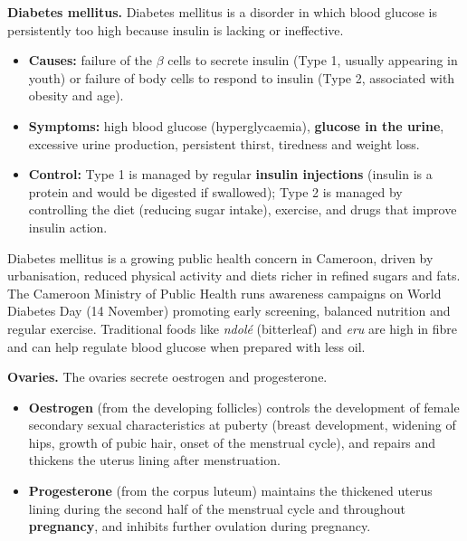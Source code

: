 \documentclass[11pt]{article}
\newcommand{\cle}[1]{{\popxbold\color{popdark}#1}}
\newcounter{popsec}
\newcounter{popsub}
\newcommand{\courssub}[1]{%
  \stepcounter{popsub}%
  \par\vspace{9pt}\noindent{\popxbold\fontsize{11.5}{13}\selectfont\color{popink}{\color{poporange}\thepopsec.\thepopsub}\hspace{6pt}#1}\par\nopagebreak\vspace{4pt}
}
\begin{document}
\textbf{Diabetes mellitus.} \cle{Diabetes mellitus} is a disorder in which blood glucose is persistently too high because insulin is lacking or ineffective.

\begin{itemize}
\item \textbf{Causes:} failure of the $\beta$ cells to secrete insulin (Type 1, usually appearing in youth) or failure of body cells to respond to insulin (Type 2, associated with obesity and age).
\item \textbf{Symptoms:} high blood glucose (hyperglycaemia), \textbf{glucose in the urine}, excessive urine production, persistent thirst, tiredness and weight loss.
\item \textbf{Control:} Type 1 is managed by regular \textbf{insulin injections} (insulin is a protein and would be digested if swallowed); Type 2 is managed by controlling the diet (reducing sugar intake), exercise, and drugs that improve insulin action.
\end{itemize}

\begin{savaistu}
Diabetes mellitus is a growing public health concern in Cameroon, driven by urbanisation, reduced physical activity and diets richer in refined sugars and fats. The Cameroon Ministry of Public Health runs awareness campaigns on World Diabetes Day (14 November) promoting early screening, balanced nutrition and regular exercise. Traditional foods like \emph{ndol\'e} (bitterleaf) and \emph{eru} are high in fibre and can help regulate blood glucose when prepared with less oil.
\end{savaistu}

\courssub{The Ovaries and the Testes}

\textbf{Ovaries.} The ovaries secrete \cle{oestrogen} and \cle{progesterone}.

\begin{itemize}
\item \textbf{Oestrogen} (from the developing follicles) controls the development of female \cle{secondary sexual characteristics} at puberty (breast development, widening of hips, growth of pubic hair, onset of the menstrual cycle), and repairs and thickens the uterus lining after menstruation.
\item \textbf{Progesterone} (from the corpus luteum) maintains the thickened uterus lining during the second half of the \cle{menstrual cycle} and throughout \textbf{pregnancy}, and inhibits further ovulation during pregnancy.
\end{itemize}
\end{document}
